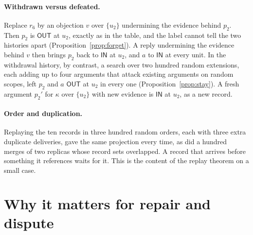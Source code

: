 \documentclass[11pt]{article}
\theoremstyle{plain}
\theoremstyle{definition}
\theoremstyle{remark}
\newcommand{\IN}{\textsf{IN}}
\newcommand{\OUT}{\textsf{OUT}}
\begin{document}
\paragraph{Withdrawn versus defeated.} Replace $r_6$ by an objection $v$ over $\{u_2\}$ undermining the evidence behind $p_2$. Then $p_2$ is $\OUT$ at $u_2$, exactly as in the table, and the label cannot tell the two histories apart (Proposition~\ref{prop:forget}). A reply undermining the evidence behind $v$ then brings $p_2$ back to $\IN$ at $u_2$, and $a$ to $\IN$ at every unit. In the withdrawal history, by contrast, a search over two hundred random extensions, each adding up to four arguments that attack existing arguments on random scopes, left $p_2$ and $a$ $\OUT$ at $u_2$ in every one (Proposition~\ref{prop:stay}). A fresh argument $p_2'$ for $\kappa$ over $\{u_2\}$ with new evidence is $\IN$ at $u_2$, as a new record.

\paragraph{Order and duplication.} Replaying the ten records in three hundred random orders, each with three extra duplicate deliveries, gave the same projection every time, as did a hundred merges of two replicas whose record sets overlapped. A record that arrives before something it references waits for it. This is the content of the replay theorem on a small case.

\section{Why it matters for repair and dispute}\label{sec:repair}
\end{document}
